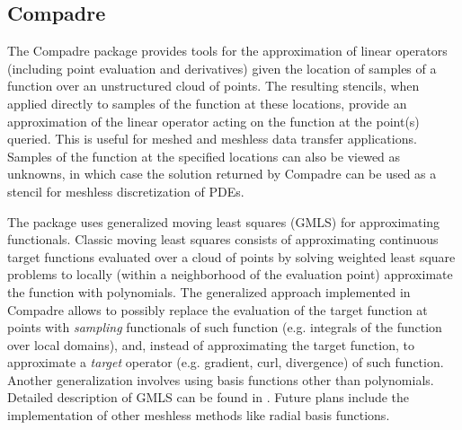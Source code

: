 \subsection{Compadre}
The Compadre package provides tools for the approximation of linear operators (including point evaluation and derivatives) given the location of samples of a function over an unstructured cloud of points. The resulting stencils, when applied directly to samples of the function at these locations, provide an approximation of the linear operator acting on the function at the point(s) queried. This is useful for meshed and meshless data transfer applications. Samples of the function at the specified locations can also be viewed as unknowns, in which case the solution returned by Compadre can be used as a stencil for meshless discretization of PDEs.

The package uses generalized moving least squares (GMLS) for approximating functionals.
Classic moving least squares consists of approximating continuous target functions evaluated over a cloud of points by solving weighted least square problems to locally (within a neighborhood of the evaluation point) approximate the function with polynomials. The generalized approach implemented in Compadre allows to possibly replace the evaluation of the target function at points with \emph{sampling} functionals of such function (e.g. integrals of the function over local domains), and, instead of approximating the target function, to approximate a \emph{target} operator (e.g. gradient, curl, divergence) of such function. Another generalization involves using basis functions other than polynomials. Detailed description of GMLS can be found in \cite{mirzaei2012generalized,wendland2004scattered}. Future plans include the implementation of other meshless methods like radial basis functions.


